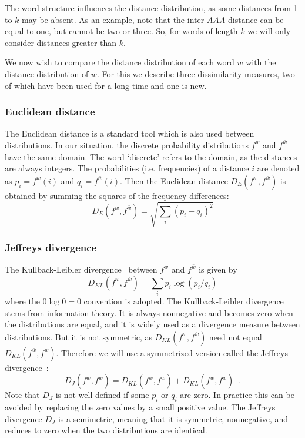 \documentclass[review,12pt]{elsarticle}
\begin{document}
The word structure influences the distance distribution,
as some distances from 1 to $k$ may be absent. As an
example, note that the inter-$AAA$ distance can be equal
to one, but cannot be two or three. So, for words of
length $k$ we will only consider distances greater
than $k$.

We now wish to compare the distance distribution of each
word $w$ with the distance distribution of $\bar{w}$.
For this we describe three dissimilarity measures,
two of which have been used for a long time and one
is new.

\subsubsection{Euclidean distance}
The Euclidean distance is a standard tool which is
also used between distributions.
In our situation, the discrete probability
distributions $f^w$ and $f^{\bar{w}}$ have the same
domain. The word `discrete' refers to the domain,
as the distances are always integers.
The probabilities (i.e. frequencies) of a distance $i$
are denoted as $p_i = f^w(i)$
and $q_i =f^{\bar{w}}(i)$.
Then the Euclidean distance $D_E(f^w,f^{\bar{w}})$
is obtained by summing the squares of the
frequency differences:
%
\begin{equation}
D_E(f^w,f^{\bar{w}})=\sqrt{\sum_i (p_i-q_i)^2}
\label{eq:DE}
\end{equation}

\subsubsection{Jeffreys divergence}
The Kullback-Leibler divergence~\cite{kullback1951}
between $f^w$ and $f^{\bar{w}}$ is given by
$$D_{KL}(f^w,f^{\bar{w}})
  =\sum_i p_i \log(p_i/q_i)$$
where the $0\log0 =0$ convention is adopted.
The Kullback-Leibler divergence stems from
information theory.
It is always nonnegative and becomes zero when the
distributions are equal, and it is widely used as a
divergence measure between distributions.
But it is not symmetric, as
$D_{KL}(f^w,f^{\bar{w}})$ need not equal
$D_{KL}(f^{\bar{w}},f^w)$.
Therefore we will use a symmetrized version called
the Jeffreys divergence~\cite{jeffreys1946}:
%
\begin{equation}
D_J(f^w,f^{\bar{w}})=D_{KL}(f^w,f^{\bar{w}})+
          D_{KL}(f^{\bar{w}},f^w)\;\;.
\label{eq:DJ}
\end{equation}
%
Note that $D_J$ is not well defined if some
$p_i$ or $q_i$ are zero. In practice this can be
avoided by replacing the zero values by a small
positive value.
The Jeffreys divergence $D_J$ is a semimetric,
meaning that it
is symmetric, nonnegative, and reduces to zero
when the two distributions are identical.
\end{document}
